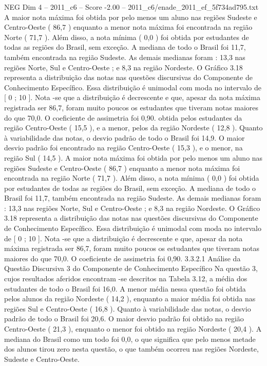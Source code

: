 \begin{textsample}{NEG Dim 4 – 2011\_c6 – Score -2.00 – 2011\_c6/enade\_2011\_ef\_5f734ad795.txt}
A maior nota máxima foi obtida por pelo menos um aluno nas regiões Sudeste e Centro-Oeste ( 86,7 ) enquanto a menor nota máxima foi encontrada na região Norte ( 71,7 ).
Além disso, a nota mínima ( 0,0 ) foi obtida por estudantes de todas as regiões do Brasil, sem exceção.
A mediana de todo o Brasil foi 11,7, também encontrada na região Sudeste.
As demais medianas foram : 13,3 nas regiões Norte, Sul e Centro-Oeste ; e 8,3 na região Nordeste.
O Gráfico 3.18 representa a distribuição das notas nas questões discursivas do Componente de Conhecimento Específico.
Essa distribuição é unimodal com moda no intervalo de [ 0 ; 10 ].
Nota -se que a distribuição é decrescente e que, apesar da nota máxima registrada ser 86,7, foram muito poucos os estudantes que tiveram notas maiores do que 70,0.
O coeficiente de assimetria foi 0,90. obtida pelos estudantes da região Centro-Oeste ( 15,5 ), e a menor, pelos da região Nordeste ( 12,8 ).
Quanto à variabilidade das notas, o desvio padrão de todo o Brasil foi 14,9.
O maior desvio padrão foi encontrado na região Centro-Oeste ( 15,3 ), e o menor, na região Sul ( 14,5 ).
A maior nota máxima foi obtida por pelo menos um aluno nas regiões Sudeste e Centro-Oeste ( 86,7 ) enquanto a menor nota máxima foi encontrada na região Norte ( 71,7 ).
Além disso, a nota mínima ( 0,0 ) foi obtida por estudantes de todas as regiões do Brasil, sem exceção.
A mediana de todo o Brasil foi 11,7, também encontrada na região Sudeste.
As demais medianas foram : 13,3 nas regiões Norte, Sul e Centro-Oeste ; e 8,3 na região Nordeste.
O Gráfico 3.18 representa a distribuição das notas nas questões discursivas do Componente de Conhecimento Específico.
Essa distribuição é unimodal com moda no intervalo de [ 0 ; 10 ].
Nota -se que a distribuição é decrescente e que, apesar da nota máxima registrada ser 86,7, foram muito poucos os estudantes que tiveram notas maiores do que 70,0.
O coeficiente de assimetria foi 0,90. 3.3.2.1 Análise da Questão Discursiva 3 do Componente de Conhecimento Específico Na questão 3, cujos resultados aferidos encontram -se descritos na Tabela 3.12, a média dos estudantes de todo o Brasil foi 16,0.
A menor média nessa questão foi obtida pelos alunos da região Nordeste ( 14,2 ), enquanto a maior média foi obtida nas regiões Sul e Centro-Oeste ( 16,8 ).
Quanto à variabilidade das notas, o desvio padrão de todo o Brasil foi 20,6.
O maior desvio padrão foi obtido na região Centro-Oeste ( 21,3 ), enquanto o menor foi obtido na região Nordeste ( 20,4 ).
A mediana do Brasil como um todo foi 0,0, o que significa que pelo menos metade dos alunos tirou zero nesta questão, o que também ocorreu nas regiões Nordeste, Sudeste e Centro-Oeste.

\end{textsample}
